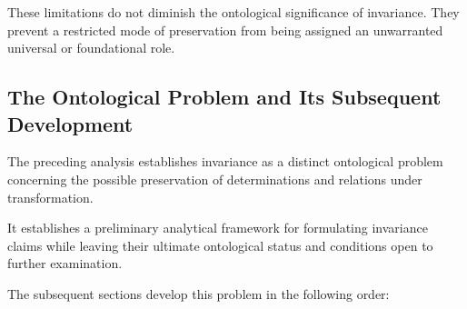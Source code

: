 These limitations do not diminish the ontological
significance of invariance. They prevent a restricted
mode of preservation from being assigned an
unwarranted universal or foundational role.

\subsection{The Ontological Problem and Its Subsequent Development}

The preceding analysis establishes invariance as
a distinct ontological problem concerning the possible
preservation of determinations and relations under
transformation.

It establishes a preliminary analytical framework
for formulating invariance claims while leaving
their ultimate ontological status and conditions
open to further examination.

The subsequent sections develop this problem
in the following order:

